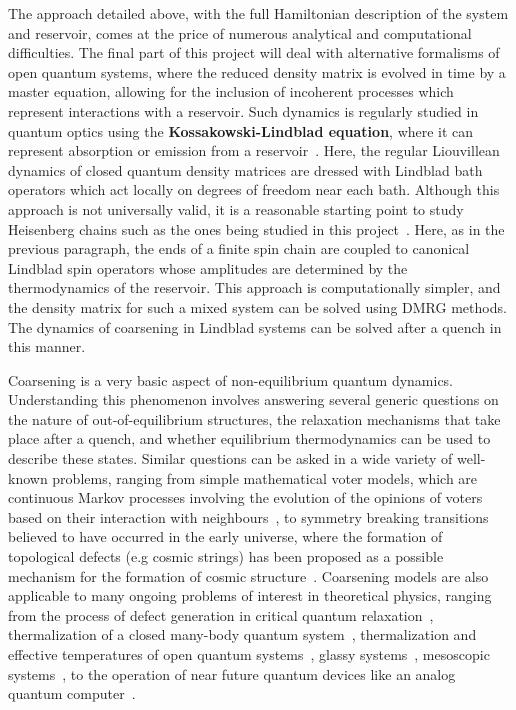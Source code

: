 \documentclass[a4paper,11pt,color]{article}
\begin{document}
\begin{enumerate}[label=(\alph*)]
The approach detailed above, with the full Hamiltonian description of the system and reservoir, comes at the price of numerous analytical and computational difficulties. The final part of this project will deal with alternative formalisms of open quantum systems, where the reduced density matrix is evolved in time by a master equation, allowing for the inclusion of incoherent processes which represent interactions with a reservoir. Such dynamics is regularly studied in quantum optics using the \textbf{Kossakowski-Lindblad equation}, where it can represent absorption or emission from a reservoir~\cite{lindblad}. Here, the regular Liouvillean dynamics of closed quantum density matrices are dressed with Lindblad bath operators which act locally on degrees of freedom near each bath. Although this approach is not universally valid, it is a reasonable starting point to study Heisenberg chains such as the ones being studied in this project~\cite{spinchains:lindblad}. Here, as in the previous paragraph, the ends of 
a finite spin chain are coupled to canonical Lindblad spin operators whose amplitudes are determined by the thermodynamics of the reservoir.  This approach is computationally simpler, and the density matrix for such a mixed system can be solved using DMRG methods. The dynamics of coarsening in Lindblad systems can be solved after a quench in this manner.

Coarsening is a very basic aspect of non-equilibrium quantum dynamics. Understanding this phenomenon involves answering  several generic questions on the nature of out-of-equilibrium structures, the relaxation mechanisms that take place after
a quench, and whether equilibrium thermodynamics can be used to describe these states.  Similar questions can be asked in a wide variety of well-known problems, ranging from simple mathematical voter models, which are continuous Markov processes involving the evolution of the opinions of voters based on their interaction with neighbours~\cite{votermodel}, to symmetry breaking transitions believed to have occurred in the early universe, where the formation of topological defects (e.g cosmic strings) has been proposed as a possible mechanism for the formation of cosmic structure~\cite{cosmicstrings}. Coarsening models are also applicable to many ongoing problems of interest in theoretical physics, ranging from the process of defect generation in critical quantum relaxation~\cite{relaxation}, thermalization of a closed many-body quantum system~\cite{krishrev, thermalization}, thermalization and effective temperatures of open quantum systems~\cite{thermopen}, glassy systems~\cite{glassy}, mesoscopic systems~\cite{meso}, to the operation of near future quantum devices like an analog quantum computer~\cite{annealing}. 


\end{enumerate}
\end{document}
